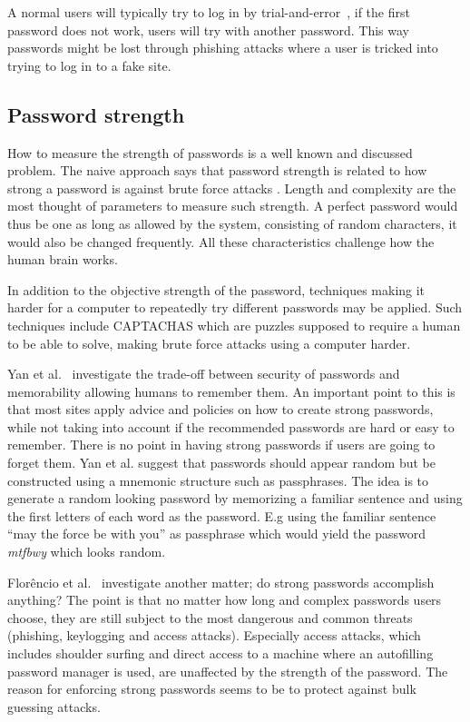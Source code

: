 \par A normal users will typically try to log in by trial-and-error~\cite{single-pw-auth}, if the first password does not work, users will try with another password. This way passwords might be lost through phishing attacks where a user is tricked into trying to log in to a fake site. 

\subsection{Password strength}\label{password-strength}
How to measure the strength of passwords is a well known and discussed problem. The naive approach says that password strength is related to how strong a password is against brute force attacks \cite{password-strength}. Length and complexity are the most thought of parameters to measure such strength. A perfect password would thus be one as long as allowed by the system, consisting of random characters, it would also be changed frequently. All these characteristics challenge how the human brain works. 
\par In addition to the objective strength of the password, techniques making it harder for a computer to repeatedly try different passwords may be applied. Such techniques include CAPTACHAS \cite{captcha} which are puzzles supposed to require a human to be able to solve, making brute force attacks using a computer harder.
\par Yan et al.~\cite{memorability_yan} investigate the trade-off between security of passwords and memorability allowing humans to remember them. An important point to this is that most sites apply advice and policies on how to create strong passwords, while not taking into account if the recommended passwords are hard or easy to remember. There is no point in having strong passwords if users are going to forget them. Yan et al. suggest that passwords should appear random but be constructed using a  mnemonic structure such as passphrases. The idea is to generate a random looking password by memorizing a familiar sentence and using the first letters of each word as the password. E.g using the familiar sentence ``may the force be with you'' as passphrase which would yield the password \emph{mtfbwy} which looks random.
\par Florêncio et al.~\cite{strong-pws_florencio} investigate another matter; do strong passwords accomplish anything? The point is that no matter how long and complex passwords users choose, they are still subject to the most dangerous and common threats (phishing, keylogging and access attacks). Especially access attacks, which includes shoulder surfing and direct access to a machine where an autofilling password manager is used, are unaffected by the strength of the password. The reason for enforcing strong passwords seems to be to protect against bulk guessing attacks. 


